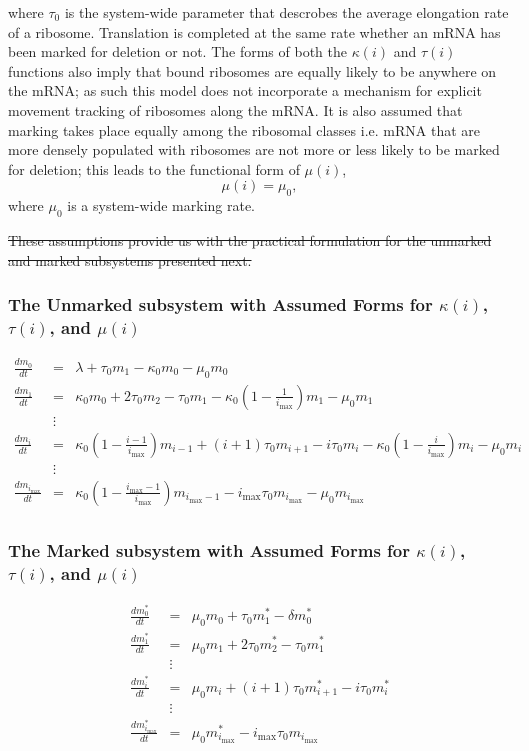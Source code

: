 \documentclass[review]{elsarticle}
\newcommand{\imax}{\ensuremath{i_{\max}}\xspace}
\begin{document}
where $\tau_0$ is the system-wide parameter that descrobes the average elongation rate of a ribosome.
Translation is completed at the same rate whether an mRNA has been marked for deletion or not.
The forms of both the $\kappa(i)$ and $\tau(i)$ functions also imply that bound ribosomes are equally likely to be anywhere on the mRNA; as such this model does not incorporate a mechanism for explicit movement tracking of ribosomes along the mRNA.
It is also assumed that marking takes place equally among the ribosomal classes i.e. mRNA that are more densely populated with ribosomes are not more or less likely to be marked for deletion; this leads to the functional form of $\mu(i)$, $$\mu(i)=\mu_0,$$ where $\mu_0$ is a system-wide marking rate.

\sout{These assumptions provide us with the practical formulation for the unmarked and marked subsystems presented next.}

\subsubsection{The Unmarked subsystem with Assumed Forms for $\kappa(i)$, $\tau(i)$, and $\mu(i)$}\label{sec:unmarked_simp}
\begin{eqnarray*}
\frac{dm_{0}}{dt} & = & \lambda+\tau_0 m_{1}-\kappa_0 m_{0}-\mu_0 m_{0} \\
\frac{dm_{1}}{dt} & = & \kappa_0 m_{0}+2\tau_0 m_{2}-\tau_0 m_{1}-\kappa_0\left(1-\frac{1}{\imax}\right) m_{1}-\mu_0 m_{1}\\
& \vdots & \\
\frac{dm_{i}}{dt} & = & \kappa_0\left(1-\frac{i-1}{\imax}\right) m_{i-1}+(i+1)\tau_0 m_{i+1}-i\tau_0 m_{i}-\kappa_0\left(1-\frac{i}{\imax}\right) m_{i}-\mu_0 m_{i} \\
& \vdots & \\
\frac{dm_{\imax}}{dt} & = & \kappa_0\left(1-\frac{\imax-1}{\imax}\right) m_{\imax-1}-\imax\tau_0 m_{\imax}-\mu_0 m_{\imax} \\
\end{eqnarray*}

\subsubsection{The Marked subsystem with Assumed Forms for $\kappa(i)$, $\tau(i)$, and $\mu(i)$}\label{sec:marked_simp}
\begin{eqnarray*}
\frac{dm_{0}^{*}}{dt} & = & \mu_0 m_{0}+\tau_0 m_{1}^{*}-\delta m_{0}^{*} \\
\frac{dm_{1}^{*}}{dt} & = & \mu_0 m_{1}+2\tau_0 m_{2}^{*}- \tau_0 m_{1}^{*} \\
& \vdots & \\
\frac{dm_{i}^{*}}{dt} & = & \mu_0 m_{i}+(i+1)\tau_0 m_{i+1}^{*}-i\tau_0m_{i}^{*} \\
& \vdots & \\
\frac{dm_{\imax}^{*}}{dt} & = & \mu_0 m_{\imax}^{*}-\imax\tau_0 m_{\imax} \\
\end{eqnarray*}
\end{document}
